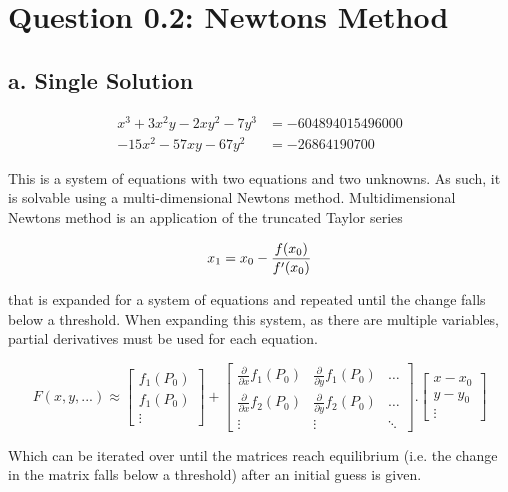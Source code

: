 \documentclass[a4paper,11pt,titlepage]{article}
\begin{document}
\section*{Question 0.2: Newtons Method}
\subsection*{a. Single Solution}

\begin{align}
x^3 + 3x^2y - 2xy^2 - 7y^3 & = -604894015496000 \label{eq:newt1}\\
-15x^2 - 57xy - 67y^2 & = -26864190700 \label{eq:newt2}
\end{align}

This is a system of equations with two equations and two unknowns. As such, it 
is solvable using a multi-dimensional Newtons method. Multidimensional Newtons 
method is an application of the truncated Taylor series

\begin{equation}
x_1 = x_0 - \frac{f(x_0)}{f'(x_0)} \notag
\end{equation}

that is expanded for a system of equations and repeated until the change 
falls below a threshold. When expanding this system, as there are multiple 
variables, partial derivatives must be used for each equation.

\begin{equation}
F(x,y,...) \approx
\begin{bmatrix}
f_1 (P_0) \\
f_1 (P_0) \\
\vdots
\end{bmatrix}
+
\begin{bmatrix}
    \frac{\partial}{\partial x} f_1 (P_0) & \frac{\partial}{\partial y} f_1 (P_0) &   \ldots \\
    \frac{\partial}{\partial x} f_2 (P_0) & \frac{\partial}{\partial y} f_2 (P_0) &   \ldots \\
    \vdots    &   \vdots     &   \ddots
\end{bmatrix}
.
\begin{bmatrix}
x - x_0 \\
y - y_0 \\
\vdots
\end{bmatrix}
\end{equation}

Which can be iterated over until the matrices reach equilibrium (i.e. the 
change in the matrix falls below a threshold) after an initial guess is given.
\end{document}
